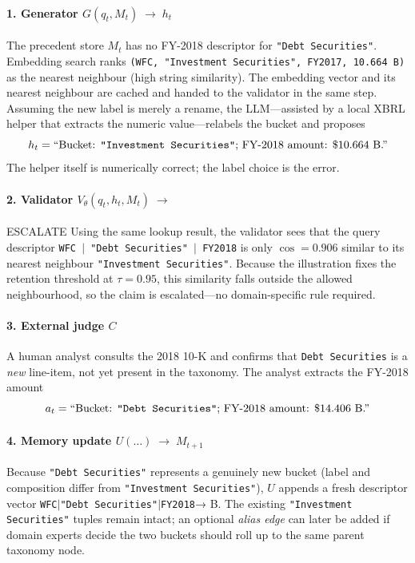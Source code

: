 \documentclass[11pt]{article}
\begin{document}
\paragraph{1. Generator $G(q_t,M_t)\;\longrightarrow\;h_t$}
The precedent store $M_t$ has no FY-2018 descriptor for
\texttt{"Debt Securities"}.  
Embedding search ranks  
\texttt{(WFC, "Investment Securities", FY2017, 10.664 B)}  
as the nearest neighbour (high string similarity).
The embedding vector and its nearest neighbour are cached and handed to the validator in the same step.
Assuming the new label is merely a rename, the LLM—assisted by a local
XBRL helper that extracts the numeric value—relabels the bucket and
proposes  
\[
h_t=\text{``Bucket: \texttt{"Investment Securities"}; FY-2018 amount: \$10.664 B.''}
\]
The helper itself is numerically correct; the label choice is the error.

\paragraph{2. Validator $V_\theta(q_t,h_t,M_t)\;\longrightarrow\;$} ESCALATE
Using the same lookup result, the validator sees that the query descriptor  
\texttt{WFC\,$\vert$\allowbreak\,"Debt Securities"\,$\vert$\allowbreak\,FY2018} is only  
$\cos=0.906$ similar to its nearest neighbour  
\texttt{"Investment Securities"}.  
Because the illustration fixes the retention threshold at $\tau=0.95$, this
similarity falls outside the allowed neighbourhood, so the claim is
escalated—no domain-specific rule required.

\paragraph{3. External judge $C$}
A human analyst consults the 2018 10-K and confirms that
\texttt{Debt Securities} is a \emph{new} line-item, not yet present in
the taxonomy.  The analyst extracts the FY-2018 amount  
\[
a_t = \text{``Bucket: \texttt{"Debt Securities"}; FY-2018 amount: \$14.406 B.''}
\]

\paragraph{4. Memory update $U(\dots)\;\longrightarrow\;M_{t+1}$}
Because \texttt{"Debt Securities"} represents a genuinely new bucket
(label and composition differ from \texttt{"Investment Securities"}),
$U$ appends a fresh descriptor vector
\texttt{WFC$\mid$"Debt Securities"$\mid$FY2018}\;→ B.  
The existing \texttt{"Investment Securities"} tuples remain intact; an
optional \emph{alias edge} can later be added if domain experts decide
the two buckets should roll up to the same parent taxonomy node.
\end{document}
